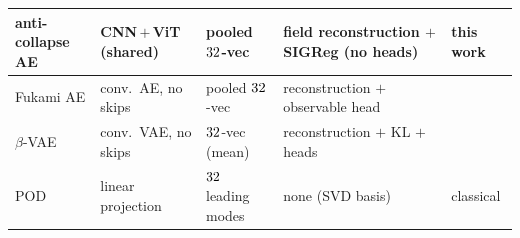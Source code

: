 \begin{table}
{\begin{tabular}{l l l l l}
    anti-collapse AE    & CNN\,$+$\,ViT (shared) & pooled $32$-vec & field reconstruction $+$ SIGReg (no heads) & this work \\
    \midrule
    Fukami AE           & conv.\ AE, no skips    & pooled $32$-vec & reconstruction $+$ observable head & \citet{fukami2023,fukami2025} \\
    $\beta$-VAE         & conv.\ VAE, no skips   & $32$-vec (mean) & reconstruction $+$ KL $+$ heads & \citet{solera2024} \\
    POD                 & linear projection      & $32$ leading modes & none (SVD basis) & classical \\
    \bottomrule
  \end{tabular}}
\end{table}
